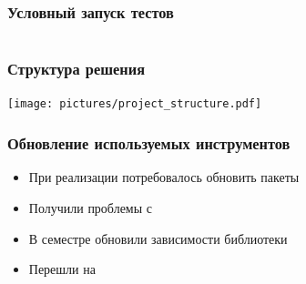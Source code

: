 \documentclass[aspectratio=169]{beamer}
\begin{document}
\begin{frame}[fragile=singleslide]
	\frametitle{Условный запуск тестов}

	\begin{center}
		\inputminted[]{python3}{pictures/minimal_example.py}
	\end{center}

\end{frame}

\begin{frame}[t]
	\frametitle{Структура решения}

	\begin{center}
		\texttt{[image: pictures/project\_structure.pdf]}
	\end{center}
\end{frame}

\begin{frame}
	\frametitle{Обновление используемых инструментов}

	\begin{itemize}
		\item При реализации потребовалось обновить пакеты
		\item Получили проблемы с \pip{}
		\item В семестре обновили зависимости библиотеки \cfpqdata
		\item Перешли на \poetry
	\end{itemize}

\end{frame}
\end{document}
